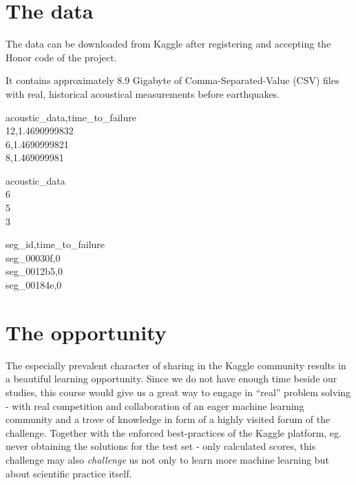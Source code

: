 \documentclass[colorback,accentcolor=tud9c,12pt]{tudreport}
\begin{document}
	\section{The data}
	The data can be downloaded from Kaggle after registering and accepting the Honor code of the project.
	
	It contains approximately 8.9 Gigabyte of Comma-Separated-Value (CSV) files with real, historical acoustical measurements before earthquakes.
		
	\vspace{5mm}
	
	\begin{minipage}[b]{0.33333\textwidth}
		acoustic\_data,time\_to\_failure\\
		12,1.4690999832\\
		6,1.4690999821\\
		8,1.469099981
	\end{minipage}%
	\begin{minipage}[b]{0.33333\textwidth}
		acoustic\_data\\
		6\\
		5\\
		3
	\end{minipage}%
	\begin{minipage}[b]{0.33333\textwidth}
		seg\_id,time\_to\_failure\\
		seg\_00030f,0\\
		seg\_0012b5,0\\
		seg\_00184e,0
	\end{minipage}%
	
	\section{The opportunity}
	The especially prevalent character of sharing in the Kaggle community results in a beautiful learning opportunity. Since we do not have enough time beside our studies, this course would give us a great way to engage in ``real'' problem solving - with real competition and collaboration of an eager machine learning community and a trove of knowledge in form of a highly visited forum of the challenge.
	Together with the enforced best-practices of the Kaggle platform, eg. never obtaining the solutions for the test set - only calculated scores, this challenge may also \textit{challenge} us not only to learn more machine learning but about scientific practice itself.
	
	
\end{document}
